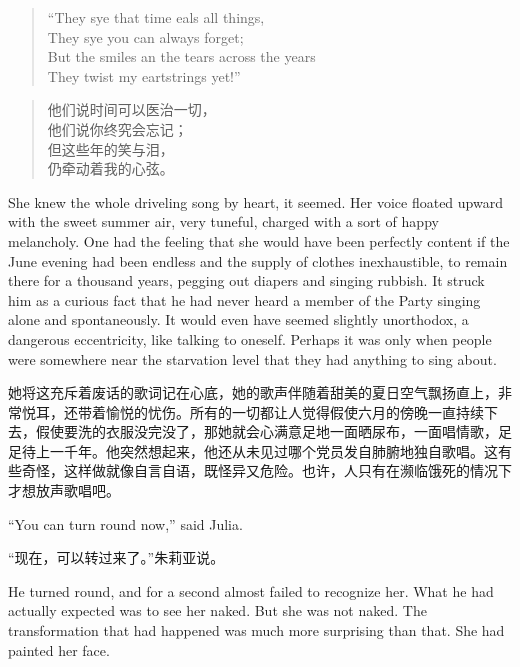 \begin{paracol}{2}
\switchcolumn*

\begin{quotation}
 \noindent ``They sye that time \textquotesingle eals all things,\\
  They sye you can always forget;\\
  But the smiles an the tears across the years\\
  They twist my \textquotesingle eartstrings yet!''
\end{quotation}

\switchcolumn

\begin{quotation}
\noindent 他们说时间可以医治一切，\\
他们说你终究会忘记；\\
但这些年的笑与泪，\\
仍牵动着我的心弦。
\end{quotation}

\switchcolumn*

She knew the whole driveling song by heart, it seemed. Her voice floated
upward with the sweet summer air, very tuneful, charged with a sort of
happy melancholy. One had the feeling that she would have been perfectly
content if the June evening had been endless and the supply of clothes
inexhaustible, to remain there for a thousand years, pegging out diapers
and singing rubbish. It struck him as a curious fact that he had never
heard a member of the Party singing alone and spontaneously. It would
even have seemed slightly unorthodox, a dangerous eccentricity, like
talking to oneself. Perhaps it was only when people were somewhere near
the starvation level that they had anything to sing about.

\switchcolumn


她将这充斥着废话的歌词记在心底，她的歌声伴随着甜美的夏日空气飘扬直上，非常悦耳，还带着愉悦的忧伤。所有的一切都让人觉得假使六月的傍晚一直持续下去，假使要洗的衣服没完没了，那她就会心满意足地一面晒尿布，一面唱情歌，足足待上一千年。他突然想起来，他还从未见过哪个党员发自肺腑地独自歌唱。这有些奇怪，这样做就像自言自语，既怪异又危险。也许，人只有在濒临饿死的情况下才想放声歌唱吧。

\switchcolumn*

``You can turn round now,'' said Julia.

\switchcolumn

``现在，可以转过来了。''朱莉亚说。

\switchcolumn*

He turned round, and for a second almost failed to recognize her. What
he had actually expected was to see her naked. But she was not naked.
The transformation that had happened was much more surprising than that.
She had painted her face.


\end{paracol}
